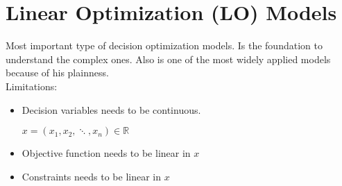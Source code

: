 \section{Linear Optimization (LO) Models}
Most important type of decision optimization models. Is the foundation to understand the complex ones. Also is one of the most widely
applied models because of his plainness.\\

Limitations:
\begin{itemize}
    \item Decision variables needs to be continuous.
    \begin{center}
        $x = (x_1, x_2, \ddots , x_n) \in \mathbb{R}$
    \end{center}
    \item Objective function needs to be linear in $x$
    \item Constraints needs to be linear in $x$
\end{itemize}

